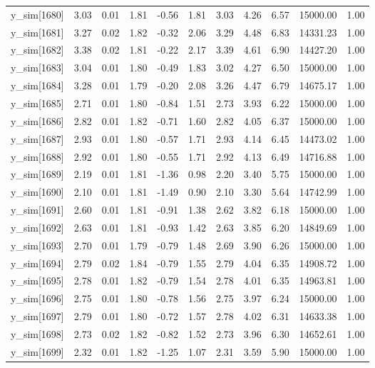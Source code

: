 \begin{table}[ht]
\begin{tabular}{rrrrrrrrrrr}
  y\_sim[1680] & 3.03 & 0.01 & 1.81 & -0.56 & 1.81 & 3.03 & 4.26 & 6.57 & 15000.00 & 1.00 \\ 
  y\_sim[1681] & 3.27 & 0.02 & 1.82 & -0.32 & 2.06 & 3.29 & 4.48 & 6.83 & 14331.23 & 1.00 \\ 
  y\_sim[1682] & 3.38 & 0.02 & 1.81 & -0.22 & 2.17 & 3.39 & 4.61 & 6.90 & 14427.20 & 1.00 \\ 
  y\_sim[1683] & 3.04 & 0.01 & 1.80 & -0.49 & 1.83 & 3.02 & 4.27 & 6.50 & 15000.00 & 1.00 \\ 
  y\_sim[1684] & 3.28 & 0.01 & 1.79 & -0.20 & 2.08 & 3.26 & 4.47 & 6.79 & 14675.17 & 1.00 \\ 
  y\_sim[1685] & 2.71 & 0.01 & 1.80 & -0.84 & 1.51 & 2.73 & 3.93 & 6.22 & 15000.00 & 1.00 \\ 
  y\_sim[1686] & 2.82 & 0.01 & 1.82 & -0.71 & 1.60 & 2.82 & 4.05 & 6.37 & 15000.00 & 1.00 \\ 
  y\_sim[1687] & 2.93 & 0.01 & 1.80 & -0.57 & 1.71 & 2.93 & 4.14 & 6.45 & 14473.02 & 1.00 \\ 
  y\_sim[1688] & 2.92 & 0.01 & 1.80 & -0.55 & 1.71 & 2.92 & 4.13 & 6.49 & 14716.88 & 1.00 \\ 
  y\_sim[1689] & 2.19 & 0.01 & 1.81 & -1.36 & 0.98 & 2.20 & 3.40 & 5.75 & 15000.00 & 1.00 \\ 
  y\_sim[1690] & 2.10 & 0.01 & 1.81 & -1.49 & 0.90 & 2.10 & 3.30 & 5.64 & 14742.99 & 1.00 \\ 
  y\_sim[1691] & 2.60 & 0.01 & 1.81 & -0.91 & 1.38 & 2.62 & 3.82 & 6.18 & 15000.00 & 1.00 \\ 
  y\_sim[1692] & 2.63 & 0.01 & 1.81 & -0.93 & 1.42 & 2.63 & 3.85 & 6.20 & 14849.69 & 1.00 \\ 
  y\_sim[1693] & 2.70 & 0.01 & 1.79 & -0.79 & 1.48 & 2.69 & 3.90 & 6.26 & 15000.00 & 1.00 \\ 
  y\_sim[1694] & 2.79 & 0.02 & 1.84 & -0.79 & 1.55 & 2.79 & 4.04 & 6.35 & 14908.72 & 1.00 \\ 
  y\_sim[1695] & 2.78 & 0.01 & 1.82 & -0.79 & 1.54 & 2.78 & 4.01 & 6.35 & 14963.81 & 1.00 \\ 
  y\_sim[1696] & 2.75 & 0.01 & 1.80 & -0.78 & 1.56 & 2.75 & 3.97 & 6.24 & 15000.00 & 1.00 \\ 
  y\_sim[1697] & 2.79 & 0.01 & 1.80 & -0.72 & 1.57 & 2.78 & 4.02 & 6.31 & 14633.38 & 1.00 \\ 
  y\_sim[1698] & 2.73 & 0.02 & 1.82 & -0.82 & 1.52 & 2.73 & 3.96 & 6.30 & 14652.61 & 1.00 \\ 
  y\_sim[1699] & 2.32 & 0.01 & 1.82 & -1.25 & 1.07 & 2.31 & 3.59 & 5.90 & 15000.00 & 1.00 \\ 

\end{tabular}
\end{table}

